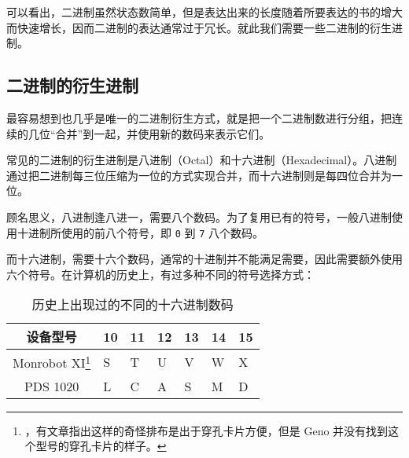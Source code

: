         可以看出，二进制虽然状态数简单，但是表达出来的长度随着所要表达的书的增大而快速增长，因而二进制的表达通常过于冗长。就此我们需要一些二进制的衍生进制。

    \subsection{二进制的衍生进制}\label{subsec:NumberSystemBasics/PositionalNotation/BinaryDerivation}
        最容易想到也几乎是唯一的二进制衍生方式，就是把一个二进制数进行分组，把连续的几位“合并”到一起，并使用新的数码来表示它们。

        常见的二进制的衍生进制是八进制（Octal）和十六进制（Hexadecimal）。八进制通过把二进制每三位压缩为一位的方式实现合并，而十六进制则是每四位合并为一位。

        顾名思义，八进制逢八进一，需要八个数码。为了复用已有的符号，一般八进制使用十进制所使用的前八个符号，即 \texttt{0} 到 \texttt{7} 八个数码。

        而十六进制，需要十六个数码，通常的十进制并不能满足需要，因此需要额外使用六个符号。在计算机的历史上，有过多种不同的符号选择方式：
        \begin{savenotes}
            \begin{table}
                \centering
                \begin{tabular}{|c|l|l|l|l|l|l|}
                    \hline
                    设备型号 & 10 & 11 & 12 & 13 & 14 & 15 \\ \hline
                    Monrobot XI\footnote{\cite[SEXADECIMAL SYSTEM]{monrobot-xi-program-manual}，有文章指出这样的奇怪排布是出于穿孔卡片方便\cite{johnmann-monrobot-xi}，但是 Geno 并没有找到这个型号的穿孔卡片的样子。} & S & T & U & V & W & X \\ \hline
                    PDS 1020 & L & C & A & S & M & D \\ \hline
                \end{tabular}
                \caption{历史上出现过的不同的十六进制数码}
                \label{tab:NumberSystemBasics/PositionalNotation/BinaryDerivation/HistoricalHexadecimalDigits}
            \end{table}
        \end{savenotes}
